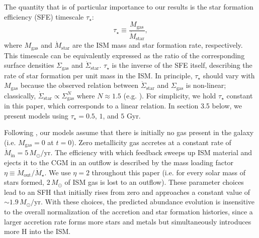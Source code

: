 \documentclass[linenumbers, twocolumn]{aastex631}
\newcommand{\Msun}{\ensuremath{M_{\odot}}}
\newcommand{\Msunyr}{\ensuremath{\Msun/\textrm{yr}}}
\begin{document}
The quantity that is of particular importance to our results is the star formation efficiency (SFE) timescale $\tau_\star$:
\begin{equation}
\tau_\star \equiv \frac{M_{\textrm{gas}}}{\dot{M}_{\textrm{star}}},
\end{equation}
where $M_{\textrm{gas}}$ and $\dot{M}_{\textrm{star}}$ are the ISM mass and star formation rate, respectively. This timescale can be equivalently expressed as the ratio of the corresponding surface densities $\Sigma_{\textrm{gas}}$ and $\dot{\Sigma}_{\textrm{star}}$. $\tau_\star$ is the inverse of the SFE itself, describing the rate of star formation per unit mass in the ISM. In principle, $\tau_\star$ should vary with $M_{\textrm{gas}}$ because the observed relation between $\dot{\Sigma}_{\textrm{star}}$ and $\Sigma_{\textrm{gas}}$ is non-linear; classically, $\dot{\Sigma}_{\textrm{star}} \propto \Sigma_{\textrm{gas}}^N$ where $N \approx 1.5$ (e.g. \citealt{Schmidt1959, Kennicutt1998}). For simplicity, we hold $\tau_\star$ constant in this paper, which corresponds to a linear relation. In section 3.5 below, we present models using $\tau_\star = 0.5$, $1$, and $5$ Gyr.

Following \citet{2022arXiv220402989C}, our models assume that there is initially no gas present in the galaxy (i.e. $M_{\textrm{gas}} = 0$ at $t = 0$). Zero metallicity gas accretes at a constant rate of $\dot{M}_\text{in} = 5\,\Msunyr$. The efficiency with which feedback sweeps up ISM material and ejects it to the CGM in an outflow is described by the mass loading factor $\eta \equiv \dot{M}_\text{out} / \dot{M}_\star$. We use $\eta = 2$ throughout this paper (i.e. for every solar mass of stars formed, $2\,\Msun$ of ISM gas is lost to an outflow). These parameter choices lead to an SFH that initially rises from zero and approaches a constant value of $\sim1.9\,\Msunyr$. With these choices, the predicted abundance evolution is insensitive to the overall normalization of the accretion and star formation histories, since a larger accretion rate forms more stars and metals but simultaneously introduces more H into the ISM.
\end{document}
